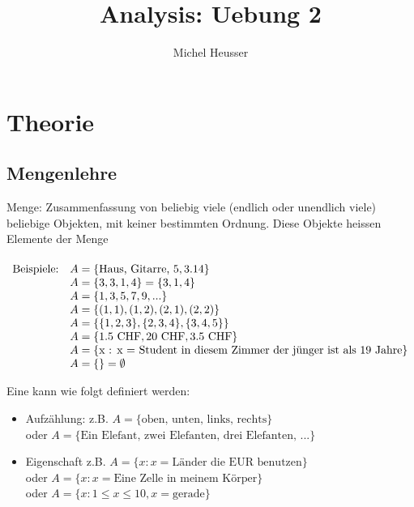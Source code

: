 \documentclass[11pt]{article} %
\title{Analysis: Uebung 2}
\author{Michel Heusser}
\begin{document}
\maketitle

\section{Theorie}

\subsection{Mengenlehre}
Menge: Zusammenfassung von beliebig viele (endlich oder unendlich viele) beliebige Objekten, mit keiner bestimmten Ordnung. Diese Objekte heissen Elemente der Menge\\\\

$\begin{array}{l l}
\textrm{Beispiele:} & A = \{\textrm{Haus, Gitarre, } 5, 3.14\}\\
   & A = \{3,3,1,4\} = \{3,1,4\}\\
& A = \{1,3,5,7,9,...\}\\
& A = \{(1,1), (1,2), (2,1), (2,2)\}\\
& A = \{\{1,2,3\},\{2,3,4\},\{3,4,5\}\}\\
& A = \{1.5 \textrm{ CHF}, 20 \textrm{ CHF}, 3.5 \textrm{ CHF}\}\\
& A = \{\textrm{x : x = Student in diesem Zimmer der jünger ist als 19 Jahre} \}\\
& A = \{\} = \emptyset
\end{array}$

Eine kann wie folgt definiert werden:
\begin{itemize}
\item Aufzählung: z.B. $A =\{\textrm{oben, unten, links, rechts}\}$ \\oder $A = \{\textrm{Ein Elefant, zwei Elefanten, drei Elefanten, ...}\}$
\item Eigenschaft z.B. $A = \{x : x = \textrm{Länder die EUR benutzen}\}$\\ oder  $A = \{x : x = \textrm{Eine Zelle in meinem Körper}\}$ \\ oder $A = \{x : 1\leq x \leq 10, x=\textrm{gerade}\}$ 
\end{itemize}
\end{document}
